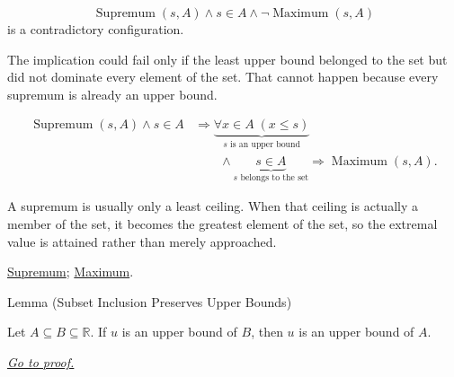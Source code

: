 \begin{remark*}
\[
\operatorname{Supremum}(s,A)\land s\in A\land \neg\operatorname{Maximum}(s,A)
\]
is a contradictory configuration.
\end{remark*}

\begin{remark*}
The implication could fail only if the least upper bound belonged to the set but did not dominate every element of the set. That cannot happen because every supremum is already an upper bound.
\end{remark*}

\begin{remark*}
\[
\begin{aligned}
\operatorname{Supremum}(s,A)\land s\in A
&\Longrightarrow
\underbrace{\forall x\in A\;(x\le s)}_{s\text{ is an upper bound}}\\
&\qquad\land
\underbrace{s\in A}_{s\text{ belongs to the set}}
\Longrightarrow
\operatorname{Maximum}(s,A).
\end{aligned}
\]
\end{remark*}

\begin{remark*}[Interpretation]
A supremum is usually only a least ceiling. When that ceiling is actually a member of the set, it becomes the greatest element of the set, so the extremal value is attained rather than merely approached.
\end{remark*}

\begin{dependencies}
\hyperref[def:supremum]{Supremum};
\hyperref[def:maximum]{Maximum}.
\end{dependencies}








\begin{lemmabox}{Lemma (Subset Inclusion Preserves Upper Bounds)}
\begin{lemma}
\label{lem:subset-inclusion-preserves-upper-bounds}
Let $A\subseteq B\subseteq\mathbb{R}$. If $u$ is an upper bound of $B$, then $u$ is an upper bound of $A$.

\smallskip
\noindent
\hyperref[prf:subset-inclusion-preserves-upper-bounds]{\textit{Go to proof.}}
\end{lemma}
\end{lemmabox}

